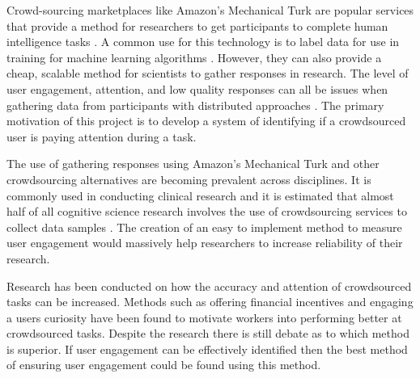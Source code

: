 \documentclass{article}
\begin{document}
Crowd-sourcing marketplaces like Amazon’s Mechanical Turk are popular services that provide a method for researchers to get participants to complete human intelligence tasks \cite{paolacci2010running}. 
A common use for this technology is to label data for use in training for machine learning algorithms \cite{chang2017revolt}.
However, they can also provide a cheap, scalable method for scientists to gather responses in research.
The level of user engagement, attention, and low quality responses can all be issues when gathering data from participants with distributed approaches \cite{ipeirotis2010quality}.
The primary motivation of this project is to develop a system of identifying if a crowdsourced user is paying attention during a task.

The use of gathering responses using Amazon's Mechanical Turk and other crowdsourcing alternatives are becoming prevalent across disciplines.
It is commonly used in conducting clinical research \cite{chandler2016conducting} and it is estimated that almost half of all cognitive science research involves the use of crowdsourcing services to collect data samples \cite{stewart2017crowdsourcing}.
The creation of an easy to implement method to measure user engagement would massively help researchers to increase reliability of their research.

Research has been conducted on how the accuracy and attention of crowdsourced tasks can be increased.
Methods such as offering financial incentives \cite{ho2015incentivizing} and engaging a users curiosity \cite{law2016curiosity} have been found to motivate workers into performing better at crowdsourced tasks.
Despite the research there is still debate as to which method is superior.
If user engagement can be effectively identified then the best method of ensuring user engagement could be found using this method.

\end{document}

